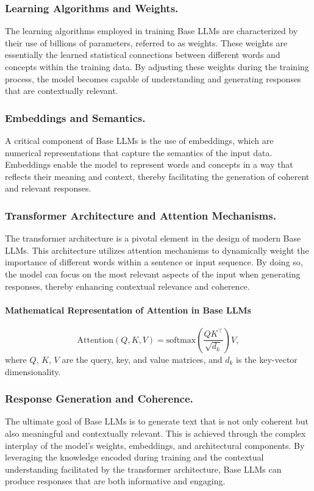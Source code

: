 \documentclass{article}
\begin{document}
\subsubsection{Learning Algorithms and Weights.} The learning algorithms employed in training Base LLMs are characterized by their use of billions of parameters, referred to as weights. These weights are essentially the learned statistical connections between different words and concepts within the training data. By adjusting these weights during the training process, the model becomes capable of understanding and generating responses that are contextually relevant.

\subsubsection{Embeddings and Semantics.} A critical component of Base LLMs is the use of embeddings, which are numerical representations that capture the semantics of the input data. Embeddings enable the model to represent words and concepts in a way that reflects their meaning and context, thereby facilitating the generation of coherent and relevant responses.

\subsubsection{Transformer Architecture and Attention Mechanisms.} The transformer architecture is a pivotal element in the design of modern Base LLMs. This architecture utilizes attention mechanisms to dynamically weight the importance of different words within a sentence or input sequence. By doing so, the model can focus on the most relevant aspects of the input when generating responses, thereby enhancing contextual relevance and coherence.

\paragraph{Mathematical Representation of Attention in Base LLMs}
\[
\text{Attention}(Q, K, V) = \text{softmax}\!\left(\frac{QK^\top}{\sqrt{d_k}}\right)V,
\]
where $Q$, $K$, $V$ are the query, key, and value matrices, and $d_k$ is the key-vector dimensionality.

\subsubsection{Response Generation and Coherence.} The ultimate goal of Base LLMs is to generate text that is not only coherent but also meaningful and contextually relevant. This is achieved through the complex interplay of the model’s weights, embeddings, and architectural components. By leveraging the knowledge encoded during training and the contextual understanding facilitated by the transformer architecture, Base LLMs can produce responses that are both informative and engaging.
\end{document}
